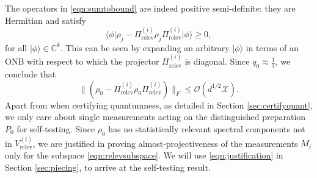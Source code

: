 The operators in \ref{eqn:sumtobound} are indeed positive semi-definite: they are Hermitian and satisfy
\begin{equation*}
\langle \phi \vert \rho_{j}-\Pi_{\text{relev}}^{(i)}\rho_{j}\Pi_{\text{relev}}^{(i)} \vert \phi \rangle \geq 0,
\end{equation*}
for all $\vert \phi\rangle\in\mathbb{C}^k$. This can be seen by expanding an arbitrary $\vert \phi \rangle $ in terms of an ONB with respect to which the projector $\Pi_{\text{relev}}^{(i)}$ is diagonal.
Since $q_0\approx\frac{1}{3}$, we conclude that
\begin{equation}
\label{eqn:justification}
\|(\rho_{0}-\Pi_{\text{relev}}^{(i)}\rho_{0}\Pi_{\text{relev}}^{(i)})\|_F \leq \mathcal{O}(d^{1/2}\mathcal{X}).
\end{equation}
Apart from when certifying quantumness, as detailed in Section \ref{sec:certifyquant}, we only care about single measurements acting on the distinguished preparation $P_0$ for self-testing. Since $\rho_0$ has no statistically relevant spectral components not in $V_{\text{relev}}^{(i)}$, we are justified in proving almost-projectiveness of the measurements $M_i$ only for the subspace \ref{eqn:relevsubspace}. We will use \ref{eqn:justification} in Section \ref{sec:piecing}, to arrive at the self-testing result.